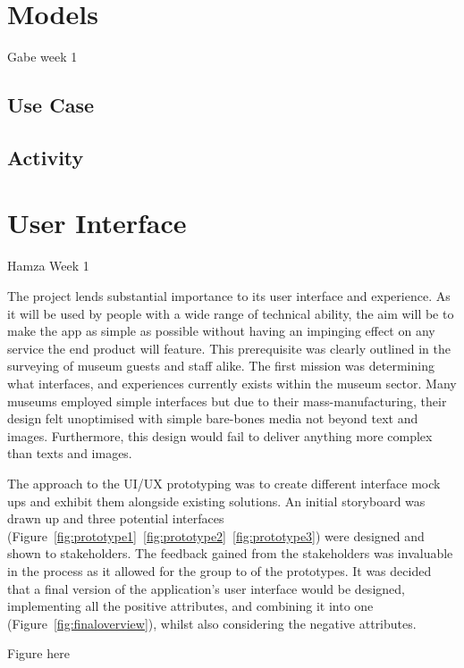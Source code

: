 \section{Models}
Gabe week 1

\subsection{Use Case}


\subsection{Activity}


\section{User Interface}
Hamza Week 1

The project lends substantial importance to its user interface and experience. As it will be used by people with a wide range of technical ability, the aim will be to make the app as simple as possible without having an impinging effect on any service the end product will feature. This prerequisite was clearly outlined in the surveying of museum guests and staff alike. The first mission was determining what interfaces, and experiences currently exists within the museum sector. Many museums employed simple interfaces but due to their mass-manufacturing, their design felt unoptimised with simple bare-bones media not beyond text and images. Furthermore, this design would fail to deliver anything more complex than texts and images.
  
The approach to the UI/UX prototyping was to create different interface mock ups and exhibit them alongside existing solutions. An initial storyboard was drawn up and three potential interfaces (Figure~\ref{fig:prototype1}~\ref{fig:prototype2}~\ref{fig:prototype3}) were designed and shown to stakeholders. The feedback gained from the stakeholders was invaluable in the process as it allowed for the group to  of the prototypes. It was decided that a final version of the application's user interface would be designed, implementing all the positive attributes, and combining it into one (Figure~\ref{fig:finaloverview}), whilst also considering the negative attributes.

Figure here


